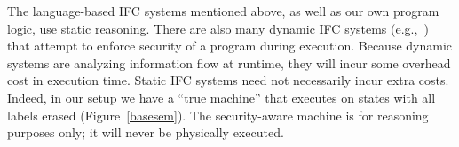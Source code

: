 \begin{comment}
Intransitive noninterference~\cite{mantel} is a declassification mechanism whereby certain specific 
downward flows are allowed in the label lattice. The system formally verifies that a program obeys
the explicitly-allowed flows. These special flows are intransitive~--- e.g., we might allow Alice 
to declassify data to Bob and Bob to declassify to Charlie, but that does not imply that Alice is
allowed to declassify to Charlie. The intransitive noninterference system is used to verify
simple imperative programs; their language is basically the same as ours, except without the
heap-related commands. One idea for future work is to generalize our state predicate $P$ into an
action $G$ that precisely describes the transformation that a program is allowed to make on the  
state. If we implemented this idea, it would be easy to embed the intransitive noninterference system. 
The action $G$ would specify exactly which special flows are allowed (e.g., the data's label can
be changed from Alice to Bob or from Bob to Charlie, but not from Alice to Charlie directly).
Ideally, we would have a formal noninterference theorem in terms of $G$ that would give the same
result as the formal guarantee in~\cite{mantel}.
\end{comment}

The language-based IFC systems mentioned above, as well as our own program logic, use static 
reasoning. There are also many dynamic IFC systems (e.g.,~\cite{austin09,hritcu13,stefan11,yang12})
that attempt to enforce security of a program during execution. Because dynamic
systems are analyzing information flow at runtime, they will incur some overhead cost in
execution time. Static IFC systems need not necessarily incur extra costs. Indeed, in our setup
we have a ``true machine'' that executes on states with all labels erased (Figure~\ref{basesem}). 
The security-aware
machine is for reasoning purposes only; it will never be physically executed.
